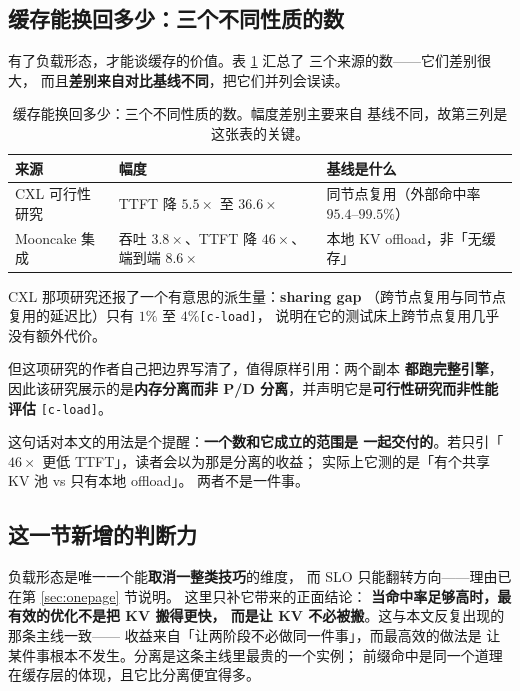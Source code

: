 \subsection{缓存能换回多少：三个不同性质的数}

有了负载形态，才能谈缓存的价值。表 \ref{tab:load} 汇总了
三个来源的数——它们差别很大，
而且\textbf{差别来自对比基线不同}，把它们并列会误读。

\begin{table}[t]
\centering
\caption{缓存能换回多少：三个不同性质的数。幅度差别主要来自
基线不同，故第三列是这张表的关键。}
\label{tab:load}
\small
\setlength{\tabcolsep}{9pt}
\begin{tabular}{@{}p{4.06cm}p{3.75cm}p{7.82cm}@{}}
\toprule
来源 & 幅度 & 基线是什么 \\
\midrule
CXL 可行性研究 & TTFT 降 $5.5\times$ 至 $36.6\times$
  & 同节点复用（外部命中率 $95.4$--$99.5\%$） \\
Mooncake 集成 & 吞吐 $3.8\times$、TTFT 降 $46\times$、
  端到端 $8.6\times$ & 本地 KV offload，非「无缓存」 \\
\bottomrule
\end{tabular}
\end{table}

\noindent CXL 那项研究还报了一个有意思的派生量：\textbf{sharing gap}
（跨节点复用与同节点复用的延迟比）只有 $1\%$ 至 $4\%$\texttt{[c-load]}，
说明在它的测试床上跨节点复用几乎没有额外代价。

\noindent 但这项研究的作者自己把边界写清了，值得原样引用：两个副本
\textbf{都跑完整引擎}，因此该研究展示的是\textbf{内存分离而非
P/D 分离}，并声明它是\textbf{可行性研究而非性能评估}
\texttt{[c-load]}。

\noindent 这句话对本文的用法是个提醒：\textbf{一个数和它成立的范围是
一起交付的}。若只引「$46\times$ 更低 TTFT」，读者会以为那是分离的收益；
实际上它测的是「有个共享 KV 池 vs 只有本地 offload」。
两者不是一件事。

\subsection{这一节新增的判断力}

负载形态是唯一一个能\textbf{取消一整类技巧}的维度，
而 SLO 只能翻转方向——理由已在第 \ref{sec:onepage} 节说明。
这里只补它带来的正面结论：
\textbf{当命中率足够高时，最有效的优化不是把 KV 搬得更快，
而是让 KV 不必被搬}。这与本文反复出现的那条主线一致——
收益来自「让两阶段不必做同一件事」，而最高效的做法是
让某件事根本不发生。分离是这条主线里最贵的一个实例；
前缀命中是同一个道理在缓存层的体现，且它比分离便宜得多。
